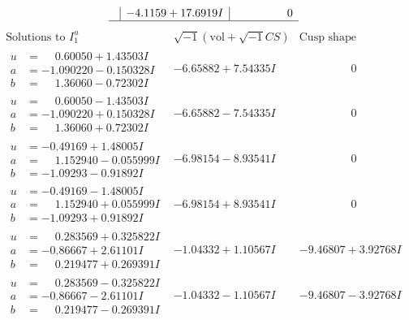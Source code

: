 \documentclass[1p]{elsarticle_modified}
\theoremstyle{definition}
\newcommand{\I}{\sqrt{-1}}
\begin{document}
$$\begin{array}{c|c|c}
 & -4.1159 + 17.6919 I & \phantom{-0.000000 } 0\\
 \hline 
 \end{array}$$\newpage$$\begin{array}{c|c|c}  
\text{Solutions to }I^u_{1}& \I (\text{vol} + \sqrt{-1}CS) & \text{Cusp shape}\\
 \hline 
\begin{aligned}
u &= \phantom{-}0.60050 + 1.43503 I \\
a &= -1.090220 - 0.150328 I \\
b &= \phantom{-}1.36060 - 0.72302 I\end{aligned}
 & -6.65882 + 7.54335 I & \phantom{-0.000000 } 0 \\ \hline\begin{aligned}
u &= \phantom{-}0.60050 - 1.43503 I \\
a &= -1.090220 + 0.150328 I \\
b &= \phantom{-}1.36060 + 0.72302 I\end{aligned}
 & -6.65882 - 7.54335 I & \phantom{-0.000000 } 0 \\ \hline\begin{aligned}
u &= -0.49169 + 1.48005 I \\
a &= \phantom{-}1.152940 - 0.055999 I \\
b &= -1.09293 - 0.91892 I\end{aligned}
 & -6.98154 - 8.93541 I & \phantom{-0.000000 } 0 \\ \hline\begin{aligned}
u &= -0.49169 - 1.48005 I \\
a &= \phantom{-}1.152940 + 0.055999 I \\
b &= -1.09293 + 0.91892 I\end{aligned}
 & -6.98154 + 8.93541 I & \phantom{-0.000000 } 0 \\ \hline\begin{aligned}
u &= \phantom{-}0.283569 + 0.325822 I \\
a &= -0.86667 + 2.61101 I \\
b &= \phantom{-}0.219477 + 0.269391 I\end{aligned}
 & -1.04332 + 1.10567 I & -9.46807 + 3.92768 I \\ \hline\begin{aligned}
u &= \phantom{-}0.283569 - 0.325822 I \\
a &= -0.86667 - 2.61101 I \\
b &= \phantom{-}0.219477 - 0.269391 I\end{aligned}
 & -1.04332 - 1.10567 I & -9.46807 - 3.92768 I \\ \hline\begin{aligned}

\end{aligned}
\end{array}$$
\end{document}
